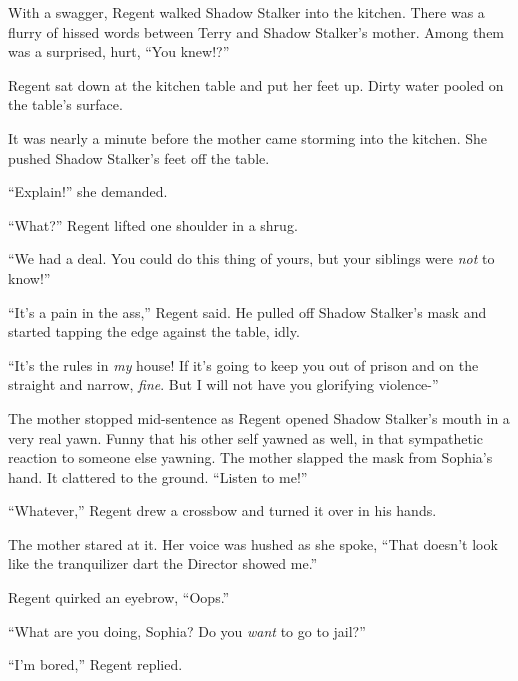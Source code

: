 With a swagger, Regent walked Shadow Stalker into the kitchen.  There was a flurry of hissed words between Terry and Shadow Stalker's mother.  Among them was a surprised, hurt, ``You knew!?''



Regent sat down at the kitchen table and put her feet up.  Dirty water pooled on the table's surface.



It was nearly a minute before the mother came storming into the kitchen.  She pushed Shadow Stalker's feet off the table.



``Explain!'' she demanded.



``What?'' Regent lifted one shoulder in a shrug.



``We had a deal.  You could do this thing of yours, but your siblings were \emph{not} to know!''



``It's a pain in the ass,'' Regent said.  He pulled off Shadow Stalker's mask and started tapping the edge against the table, idly.



``It's the rules in \emph{my} house!  If it's going to keep you out of prison and on the straight and narrow, \emph{fine}.  But I will not have you glorifying violence-''



The mother stopped mid-sentence as Regent opened Shadow Stalker's mouth in a very real yawn.  Funny that his other self yawned as well, in that sympathetic reaction to someone else yawning.  The mother slapped the mask from Sophia's hand.  It clattered to the ground.  ``Listen to me!''



``Whatever,'' Regent drew a crossbow and turned it over in his hands.



The mother stared at it.  Her voice was hushed as she spoke, ``That doesn't look like the tranquilizer dart the Director showed me.''



Regent quirked an eyebrow, ``Oops.''



``What are you doing, Sophia?  Do you \emph{want} to go to jail?''



``I'm bored,'' Regent replied.



